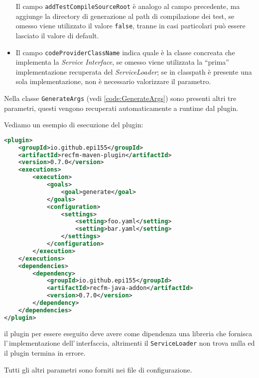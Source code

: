 \documentclass[a4paper,10pt]{report}
\begin{document}
\begin{itemize}
	Il campo \verb!addTestCompileSourceRoot! è analogo al campo precedente,
	ma aggiunge la directory di generazione al path di compilazione dei test,
	se omesso viene utilizzato il valore \verb!false!, tranne in casi 
	particolari può essere lasciato il valore di default.
\item {}
	Il campo \verb!codeProviderClassName! indica quale è la classe concreata
	che implementa la \textsl{Service Interface}, se omesso viene utilizzata
	la ``prima'' implementazione recuperata del \textsl{ServiceLoader}; se in
	classpath è presente una sola implementazione, non è necessario valorizzare
	il parametro.
\end{itemize}
Nella classe \verb!GenerateArgs! (vedi \ref{code:GenerateArgs}) sono presenti 
altri tre parametri, questi vengono recuperati automaticamente a runtime dal 
plugin.

Vediamo un esempio di esecuzione del plugin:

\begin{lstlisting}[language=XML, caption=esempio minimale di esecuzione del 
plugin, label=code:spring-conf]
<plugin>
    <groupId>io.github.epi155</groupId>
    <artifactId>recfm-maven-plugin</artifactId>
    <version>0.7.0</version>
    <executions>
        <execution>
            <goals>
                <goal>generate</goal>
            </goals>
            <configuration>
                <settings>
                    <setting>foo.yaml</setting>
                    <setting>bar.yaml</setting>
                </settings>
            </configuration>
        </execution>
    </executions>
    <dependencies>
        <dependency>
            <groupId>io.github.epi155</groupId>
            <artifactId>recfm-java-addon</artifactId>
            <version>0.7.0</version>
        </dependency>
    </dependencies>
</plugin>
\end{lstlisting}
il plugin per essere eseguito deve avere come dipendenza una libreria che 
fornisca l'\,implementazione dell'\,inter\-fac\-cia, altrimenti il 
\verb!ServiceLoader! non trova nulla ed il plugin termina in errore.

Tutti gli altri parametri sono forniti nei file di configurazione.
\end{document}
